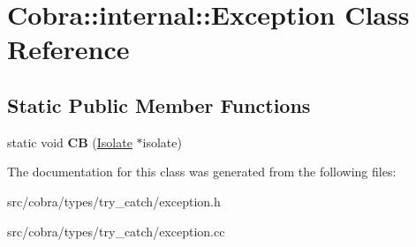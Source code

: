 \hypertarget{class_cobra_1_1internal_1_1_exception}{\section{Cobra\+:\+:internal\+:\+:Exception Class Reference}
\label{class_cobra_1_1internal_1_1_exception}
}
\subsection*{Static Public Member Functions}
\begin{DoxyCompactItemize}
\item 
\hypertarget{class_cobra_1_1internal_1_1_exception_a6e13f84953c641f90429bb133051d51c}{static void {\bfseries C\+B} (\hyperlink{class_cobra_1_1internal_1_1_isolate}{Isolate} $\ast$isolate)}\label{class_cobra_1_1internal_1_1_exception_a6e13f84953c641f90429bb133051d51c}

\end{DoxyCompactItemize}


The documentation for this class was generated from the following files\+:\begin{DoxyCompactItemize}
\item 
src/cobra/types/try\+\_\+catch/exception.\+h\item 
src/cobra/types/try\+\_\+catch/exception.\+cc\end{DoxyCompactItemize}
